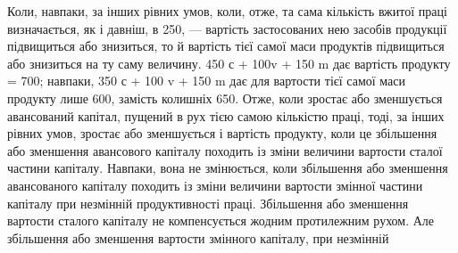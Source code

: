 Коли, навпаки, за інших рівних умов, коли, отже, та сама кількість
вжитої праці визначається, як і давніш, в 250, — вартість застосованих нею
засобів продукції підвищиться або знизиться, то й вартість тієї самої маси продуктів
підвищиться або знизиться на ту саму величину. 450 с + 100v + 150  m
дає вартість продукту = 700; навпаки, 350 с + 100 v + 150 m дає для вартости
тієї самої маси продукту лише 600, замість колишніх 650. Отже, коли зростає
або зменшується авансований капітал, пущений в рух тією самою кількістю
праці, тоді, за інших рівних умов, зростає або зменшується і вартість продукту,
коли це збільшення або зменшення авансового капіталу походить із зміни
величини вартости сталої частини капіталу. Навпаки, вона не змінюється, коли
збільшення або зменшення авансованого капіталу походить із зміни величини
вартости змінної частини капіталу при незмінній продуктивності праці. Збільшення
або зменшення вартости сталого капіталу не компенсується жодним протилежним
рухом. Але збільшення або зменшення вартости змінного капіталу, при незмінній
